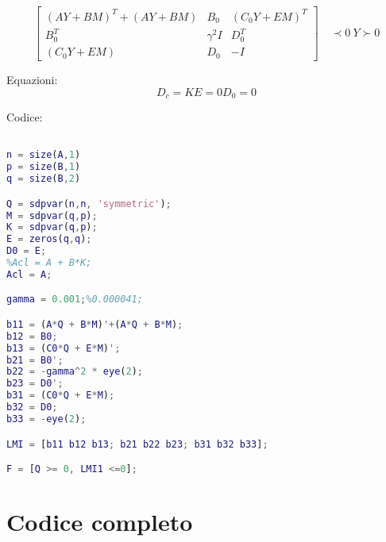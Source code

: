 \documentclass{article}
\begin{document}
\begin{equation*}

\begin{bmatrix} (AY + BM)^{T} + (AY + BM) & B_0 & (C_{0}Y + EM)^{T} \\ B_{0}^{T} & \gamma^{2}I & D_{0}^{T} \\ (C_{0}Y + EM) & D_{0} & -I  
\end{bmatrix}\quad \prec 0

~

Y \succ 0

\end{equation*}

Equazioni:
\begin{equation*}

D_c = K

E = 0

D_0 = 0

\end{equation*}


Codice:


\begin{lstlisting}[language=Matlab]

n = size(A,1)
p = size(B,1)
q = size(B,2)

Q = sdpvar(n,n, 'symmetric');
M = sdpvar(q,p);
K = sdpvar(q,p);
E = zeros(q,q);
D0 = E;
%Acl = A + B*K;
Acl = A;

gamma = 0.001;%0.000041;

b11 = (A*Q + B*M)'+(A*Q + B*M);
b12 = B0;
b13 = (C0*Q + E*M)';
b21 = B0';
b22 = -gamma^2 * eye(2);
b23 = D0';
b31 = (C0*Q + E*M);
b32 = D0;
b33 = -eye(2);

LMI = [b11 b12 b13; b21 b22 b23; b31 b32 b33];

F = [Q >= 0, LMI1 <=0];


\end{lstlisting}


\section{Codice completo}
\end{document}
